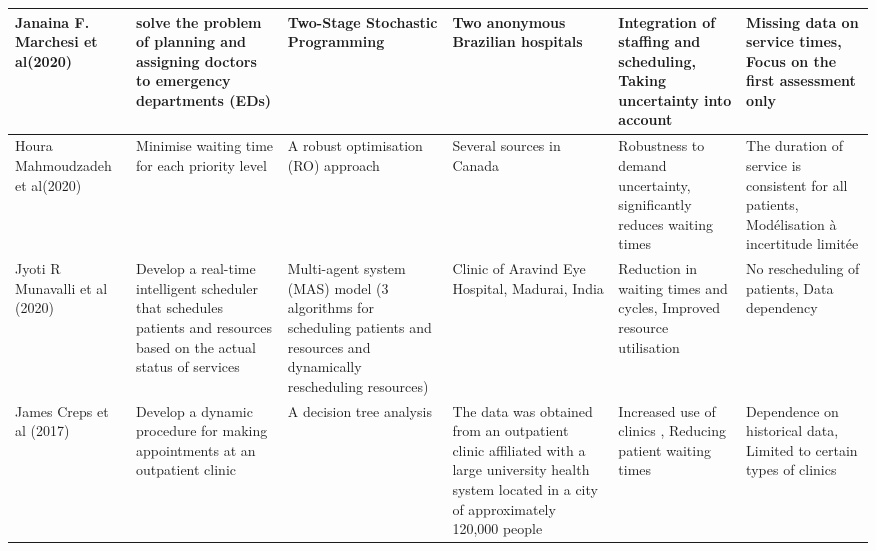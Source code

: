 \documentclass[runningheads]{llncs}
\begin{document}
\begin{landscape}
\begin{longtable}{|p{3cm}|p{3cm}|p{4cm}|p{3cm}|p{3cm}|p{3cm}|}
\hline
\cite{marchesi2020physician} Janaina F. Marchesi et al(2020)&solve the problem of planning and assigning doctors to emergency departments (EDs)&Two-Stage Stochastic Programming&Two anonymous Brazilian hospitals &Integration of staffing and scheduling, Taking uncertainty into account&Missing data on service times, Focus on the first assessment only\\
\hline
\cite{mahmoudzadeh2020robust}Houra Mahmoudzadeh et al(2020) & Minimise waiting time for each priority level
&A robust optimisation (RO) approach &Several sources in Canada &Robustness to demand uncertainty, significantly reduces waiting times&The duration of service is consistent for all patients, Modélisation à incertitude limitée\\
\hline
\cite{munavalli2020mas} Jyoti R Munavalli et al (2020) & Develop a real-time intelligent scheduler that schedules patients and resources based on the actual status of services&Multi-agent system (MAS) model (3 algorithms for scheduling patients and resources and dynamically rescheduling resources)&Clinic of Aravind Eye Hospital, Madurai, India&Reduction in waiting times and cycles, Improved resource utilisation&No rescheduling of patients, Data dependency\\
\hline
\cite{creps2017outpatient} James Creps et al (2017) &Develop a dynamic procedure for making appointments at an outpatient clinic&A decision tree analysis & The data was obtained from an outpatient clinic affiliated with a large university health system located in a city of approximately 120,000 people&Increased use of clinics
, Reducing patient waiting times&Dependence on historical data, Limited to certain types of clinics\\
\hline
\end{longtable}

\end{landscape}
\end{document}
